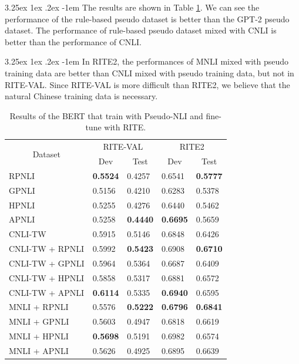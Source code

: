 \documentclass[12pt]{article}
\makeatletter
\renewcommand\paragraph{\@startsection{paragraph}{5}{\z@}%
  {3.25ex \@plus1ex \@minus.2ex}%
  {-1em}%
  {\normalfont\normalsize\bfseries}}
\makeatother
\begin{document}
\begin{CJK*}{UTF8}{bkai}
\begin{spacing}{1.77}
\paragraph{}
The results are shown in Table \ref{result:pseudo_nli_bert}. We can see the performance of the rule-based pseudo dataset is better than the GPT-2 pseudo dataset. The performance of rule-based pseudo dataset mixed with CNLI is better than the performance of CNLI.

\paragraph{}
In RITE2, the performances of MNLI mixed with pseudo training data are better than CNLI mixed with pseudo training data, but not in RITE-VAL. Since RITE-VAL is more difficult than RITE2, we believe that the natural Chinese training data is necessary.

\begin{table}[H]
  \centering
  \setlength{\extrarowheight}{-3pt}
  \caption{Results of the BERT that train with Pseudo-NLI and fine-tune with RITE.}
  \label{result:pseudo_nli_bert}
  \begin{tabular}{|l|l|l|l|l|}
  \hline
  \multicolumn{1}{|c|}{\multirow{2}{*}{Dataset}} & \multicolumn{2}{c|}{RITE-VAL} & \multicolumn{2}{c|}{RITE2} \\ \cline{2-5}
  \multicolumn{1}{|c|}{} & \multicolumn{1}{c|}{Dev} & \multicolumn{1}{c|}{Test} & \multicolumn{1}{c|}{Dev} & \multicolumn{1}{c|}{Test} \\ \hline
  RPNLI & \textbf{0.5524} & 0.4257 & 0.6541 & \textbf{0.5777} \\ \hline
  GPNLI & 0.5156 & 0.4210 & 0.6283 & 0.5378 \\ \hline
  HPNLI & 0.5255 & 0.4276 & 0.6440 & 0.5462 \\ \hline
  APNLI & 0.5258 & \textbf{0.4440} & \textbf{0.6695} & 0.5659 \\
  \hline \hline
  CNLI-TW & 0.5915 & 0.5146 & 0.6848 & 0.6426 \\ \hline
  CNLI-TW + RPNLI & 0.5992 & \textbf{0.5423} & 0.6908 & \textbf{0.6710} \\ \hline
  CNLI-TW + GPNLI & 0.5964 & 0.5364 & 0.6687 & 0.6409 \\ \hline
  CNLI-TW + HPNLI & 0.5858 & 0.5317 & 0.6881 & 0.6572 \\ \hline
  CNLI-TW + APNLI & \textbf{0.6114} & 0.5335 & \textbf{0.6940} & 0.6595 \\
  \hline \hline
  MNLI + RPNLI & 0.5576 & \textbf{0.5222} & \textbf{0.6796} & \textbf{0.6841} \\ \hline
  MNLI + GPNLI & 0.5603 & 0.4947 & 0.6818 & 0.6619 \\ \hline
  MNLI + HPNLI & \textbf{0.5698} & 0.5191 & 0.6982 & 0.6574 \\ \hline
  MNLI + APNLI & 0.5626 & 0.4925 & 0.6895 & 0.6639 \\ \hline
  \end{tabular}
\end{table}


\end{spacing}
\end{CJK*}
\end{document}

